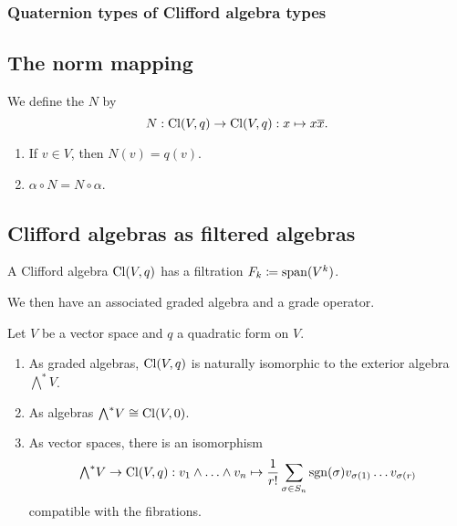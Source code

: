 \subsubsection{Quaternion types of Clifford algebra types}

\subsection{The norm mapping}
\begin{definition}
We define the  $N$ by
\[ N: \operatorname{Cl}(V,q)\to \operatorname{Cl}(V,q): x\mapsto x \overline{x}. \]
\end{definition}
\begin{lemma} \label{normIsQuadraticForm}
\begin{enumerate}
\item If $v\in V$, then $N(v) = q(v)$.
\item $\alpha\circ N = N\circ \alpha$.
\end{enumerate}
\end{lemma}


\subsection{Clifford algebras as filtered algebras}
\begin{proposition}
A Clifford algebra $\operatorname{Cl}(V,q)$ has a filtration $F_k \coloneqq \operatorname{span}(V^{k})$.
\end{proposition}

We then have an associated graded algebra and a grade operator.

\begin{proposition}
Let $V$ be a vector space and $q$ a quadratic form on $V$.
\begin{enumerate}
\item As graded algebras, $\operatorname{Cl}(V,q)$ is naturally isomorphic to the exterior algebra ${\textstyle\bigwedge}^* V$.
\item As algebras ${\textstyle\bigwedge}^* V \cong \operatorname{Cl}(V,0)$.
\item As vector spaces, there is an isomorphism
\[ {\textstyle\bigwedge}^* V \to \operatorname{Cl}(V,q): v_1\wedge \ldots \wedge v_n \mapsto \frac{1}{r!}\sum_{\sigma\in S_n}\operatorname{sgn}(\sigma)v_{\sigma(1)}\hdots v_{\sigma(r)} \]
compatible with the fibrations.
\end{enumerate}
\end{proposition}



